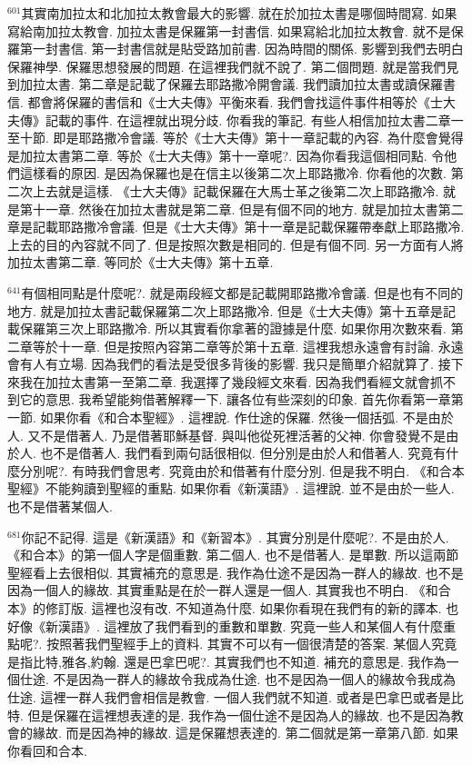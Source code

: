 \documentclass{book}
\begin{document}
$^{601}$其實南加拉太和北加拉太教會最大的影響.
就在於加拉太書是哪個時間寫.
如果寫給南加拉太教會.
加拉太書是保羅第一封書信.
如果寫給北加拉太教會.
就不是保羅第一封書信.
第一封書信就是貼受路加前書.
因為時間的關係.
影響到我們去明白保羅神學.
保羅思想發展的問題.
在這裡我們就不說了.
第二個問題.
就是當我們見到加拉太書.
第二章是記載了保羅去耶路撒冷開會議.
我們讀加拉太書或讀保羅書信.
都會將保羅的書信和《士大夫傳》平衡來看.
我們會找這件事件相等於《士大夫傳》記載的事件.
在這裡就出現分歧.
你看我的筆記.
有些人相信加拉太書二章一至十節.
即是耶路撒冷會議.
等於《士大夫傳》第十一章記載的內容.
為什麼會覺得是加拉太書第二章.
等於《士大夫傳》第十一章呢?.
因為你看我這個相同點.
令他們這樣看的原因.
是因為保羅也是在信主以後第二次上耶路撒冷.
你看他的次數.
第二次上去就是這樣.
《士大夫傳》記載保羅在大馬士革之後第二次上耶路撒冷.
就是第十一章.
然後在加拉太書就是第二章.
但是有個不同的地方.
就是加拉太書第二章是記載耶路撒冷會議.
但是《士大夫傳》第十一章是記載保羅帶奉獻上耶路撒冷.
上去的目的內容就不同了.
但是按照次數是相同的.
但是有個不同.
另一方面有人將加拉太書第二章.
等同於《士大夫傳》第十五章.

$^{641}$有個相同點是什麼呢?.
就是兩段經文都是記載開耶路撒冷會議.
但是也有不同的地方.
就是加拉太書記載保羅第二次上耶路撒冷.
但是《士大夫傳》第十五章是記載保羅第三次上耶路撒冷.
所以其實看你拿著的證據是什麼.
如果你用次數來看.
第二章等於十一章.
但是按照內容第二章等於第十五章.
這裡我想永遠會有討論.
永遠會有人有立場.
因為我們的看法是受很多背後的影響.
我只是簡單介紹就算了.
接下來我在加拉太書第一至第二章.
我選擇了幾段經文來看.
因為我們看經文就會抓不到它的意思.
我希望能夠借著解釋一下.
讓各位有些深刻的印象.
首先你看第一章第一節.
如果你看《和合本聖經》.
這裡說.
作仕途的保羅.
然後一個括弧.
不是由於人.
又不是借著人.
乃是借著耶穌基督.
與叫他從死裡活著的父神.
你會發覺不是由於人.
也不是借著人.
我們看到兩句話很相似.
但分別是由於人和借著人.
究竟有什麼分別呢?.
有時我們會思考.
究竟由於和借著有什麼分別.
但是我不明白.
《和合本聖經》不能夠讀到聖經的重點.
如果你看《新漢語》.
這裡說.
並不是由於一些人.
也不是借著某個人.

$^{681}$你記不記得.
這是《新漢語》和《新習本》.
其實分別是什麼呢?.
不是由於人.
《和合本》的第一個人字是個重數.
第二個人.
也不是借著人.
是單數.
所以這兩節聖經看上去很相似.
其實補充的意思是.
我作為仕途不是因為一群人的緣故.
也不是因為一個人的緣故.
其實重點是在於一群人還是一個人.
其實我也不明白.
《和合本》的修訂版.
這裡也沒有改.
不知道為什麼.
如果你看現在我們有的新的譯本.
也好像《新漢語》.
這裡放了我們看到的重數和單數.
究竟一些人和某個人有什麼重點呢?.
按照著我們聖經手上的資料.
其實不可以有一個很清楚的答案.
某個人究竟是指比特,雅各,約翰.
還是巴拿巴呢?.
其實我們也不知道.
補充的意思是.
我作為一個仕途.
不是因為一群人的緣故令我成為仕途.
也不是因為一個人的緣故令我成為仕途.
這裡一群人我們會相信是教會.
一個人我們就不知道.
或者是巴拿巴或者是比特.
但是保羅在這裡想表達的是.
我作為一個仕途不是因為人的緣故.
也不是因為教會的緣故.
而是因為神的緣故.
這是保羅想表達的.
第二個就是第一章第八節.
如果你看回和合本.
\end{document}

